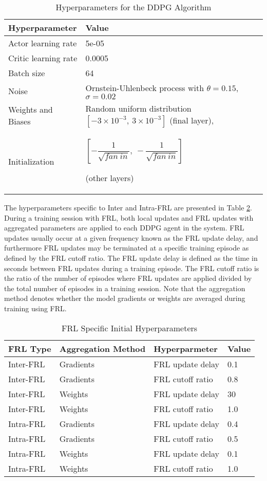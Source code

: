 \begin{table}[H]
    \centering
    \caption{Hyperparameters for the DDPG Algorithm}
    \begin{tabular}{lll} \toprule
        Hyperparameter & Value \\
        \midrule
        Actor learning rate & 5e-05\\ \hline
        Critic learning rate & 0.0005\\ \hline
        Batch size & 64\\ \hline
        Noise & Ornstein-Uhlenbeck process with $\theta=0.15$, $\sigma=0.02$ \\ \hline
        Weights and Biases  & Random uniform distribution $[-3\times10^{-3},\:3\times10^{-3}]$ (final layer), \\
        Initialization    & \begin{tiny}$\left[-\dfrac{1}{\sqrt{fan\:in}},\:-\dfrac{1}{\sqrt{fan\:in}}\right]$\end{tiny} (other layers)\\        \bottomrule
    \end{tabular}
    \label{tab:ddpg_hyps}
\end{table}

The hyperparameters specific to Inter and Intra-FRL are presented in Table \ref{tab:frlhyps}.
During a training session with FRL, both local updates and FRL updates with aggregated
parameters are applied to each DDPG agent in the system. FRL updates usually
occur at a given frequency known as the FRL update delay, and furthermore FRL updates
may be terminated at a specific training episode as defined by the FRL cutoff ratio.  The
FRL update delay is defined as the time in seconds between FRL updates during a training
episode. The FRL cutoff ratio is the ratio of the number of episodes where FRL updates
are applied divided by the total number of episodes in a training session. Note that the
aggregation method denotes whether the model gradients or weights are averaged during
training using FRL.
\begin{table}[H]
    \caption{FRL Specific Initial Hyperparameters}
    \centering
    \begin{tabular}{llll}
        \toprule
        FRL Type & Aggregation Method & Hyperparmeter & Value \\
        \midrule
        Inter-FRL & Gradients & FRL update delay &  0.1 \\
        Inter-FRL & Gradients & FRL cutoff ratio &  0.8  \\
        Inter-FRL & Weights & FRL update delay &  30  \\
        Inter-FRL & Weights & FRL cutoff ratio &  1.0   \\
        Intra-FRL & Gradients & FRL update delay &  0.4  \\
        Intra-FRL & Gradients & FRL cutoff ratio &  0.5  \\
        Intra-FRL & Weights & FRL update delay &  0.1  \\
        Intra-FRL & Weights & FRL cutoff ratio &  1.0  \\
        \bottomrule
    \end{tabular}
    \label{tab:frlhyps}
\end{table}

